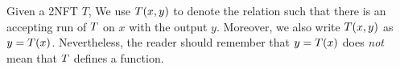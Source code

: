 

Given a 2NFT $T$, We use $T(x, y)$ to denote the relation such that there is an accepting run of $T$ on $x$ with the output $y$.
Moreover, we also write $T(x, y)$ as $y = T(x)$.
Nevertheless, the reader should remember that $y= T(x)$ does \emph{not} mean that $T$ defines a function.




